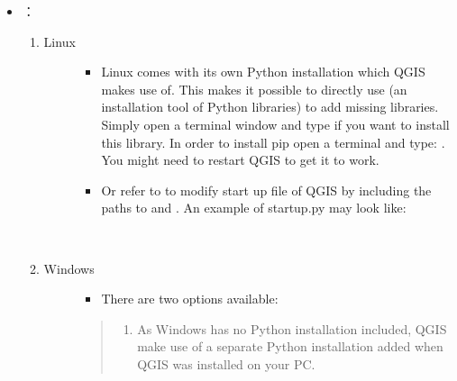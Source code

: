 \documentclass[letterpaper,10pt,english]{sphinxmanual}
\begin{document}
\begin{itemize}
\item {} 
：
\begin{enumerate}
\item {} \begin{description}
\item[{Linux}] \leavevmode\begin{itemize}
\item {} 
Linux comes with its own Python installation which QGIS makes use of. This makes it possible to directly use  (an installation tool of Python libraries) to add missing libraries. Simply open a terminal window and type  if you want to install this library. In order to install pip open a terminal and type: . You might need to restart QGIS to get it to work.

\item {} 
Or refer to  to modify start up file of QGIS by including the paths to  and . An example of startup.py may look like:

%
\begin{sphinxVerbatim}[commandchars=\\\{\}]
 
\end{sphinxVerbatim}

\end{itemize}

\end{description}

\item {} \begin{description}
\item[{Windows}] \leavevmode\begin{itemize}
\item {} 
There are two options available:

\end{itemize}
\begin{quote}
\begin{enumerate}
\item {} 
As Windows has no Python installation included, QGIS make use of a separate Python installation added when QGIS was installed on your PC.


\end{enumerate}
\end{quote}
\end{description}
\end{enumerate}
\end{itemize}
\end{document}
